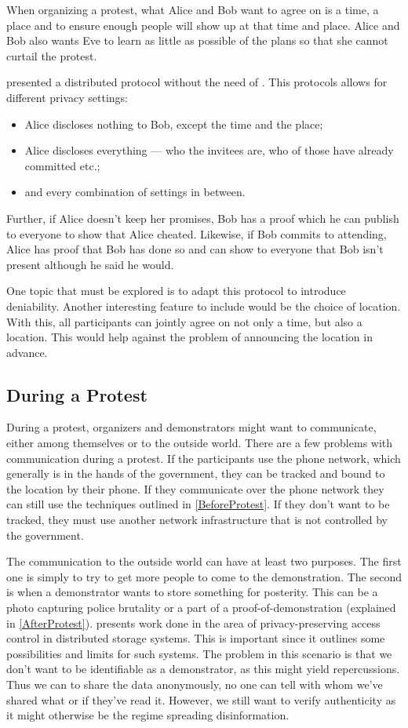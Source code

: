 \documentclass[a4paper]{llncs}
\begin{document}
When organizing a protest, what Alice and Bob want to agree on is a time, 
a place and to ensure enough people will show up at that time and place.
Alice and Bob also wants Eve to learn as little as possible of the plans so 
that she cannot curtail the protest.

\citet{EventsInvitations} presented a distributed protocol without the need of 
.
This protocols allows for different privacy settings:
\begin{itemize}
\item Alice discloses nothing to Bob, except the time and the place;
\item Alice discloses everything --- who the invitees are, who of those have 
  already committed etc.;
\item and every combination of settings in between.
\end{itemize}
Further, if Alice doesn't keep her promises, Bob has a proof which he can 
publish to everyone to show that Alice cheated.
Likewise, if Bob commits to attending, Alice has proof that Bob has done so and 
can show to everyone that Bob isn't present although he said he would.

One topic that must be explored is to adapt this protocol to introduce 
deniability.
Another interesting feature to include would be the choice of location.
With this, all participants can jointly agree on not only a time, but also 
a location.
This would help against the problem of announcing the location in advance.

\subsection{During a Protest}
\label{DuringProtest}

During a protest, organizers and demonstrators might want to communicate, 
either among themselves or to the outside world.
There are a few problems with communication during a protest.
If the participants use the phone network, which generally is in the hands of 
the government, they can be tracked and bound to the location by their phone.
If they communicate over the phone network they can still use the techniques 
outlined in \cref{BeforeProtest}.
If they don't want to be tracked, they must use another network infrastructure 
that is not controlled by the government.

The communication to the outside world can have at least two purposes.
The first one is simply to try to get more people to come to the demonstration.
The second is when a demonstrator wants to store something for posterity.
This can be a photo capturing police brutality or a part of 
a proof-of-demonstration (explained in \cref{AfterProtest}).
\citet{DistStorAccessControl} presents work done in the area of 
privacy-preserving access control in distributed storage systems.
This is important since it outlines some possibilities and limits for such 
systems.
The problem in this scenario is that we don't want to be identifiable as 
a demonstrator, as this might yield repercussions.
Thus we can to share the data anonymously, no one can tell with whom we've 
shared what or if they've read it.
However, we still want to verify authenticity as it might otherwise be the 
regime spreading disinformation.
\end{document}
